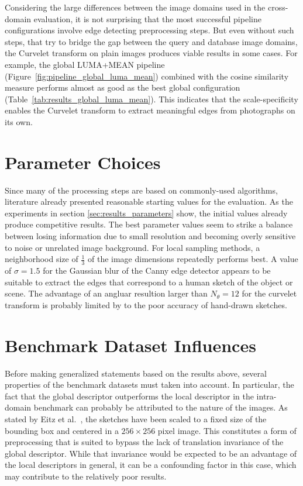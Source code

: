 Considering the large differences between the image domains used in the
cross-domain evaluation, it is not surprising that the most successful pipeline
configurations involve edge detecting preprocessing steps. But even without
such steps, that try to bridge the gap between the query and database image
domains, the Curvelet transform on plain images produces viable results in some
cases. For example, the global LUMA+MEAN pipeline
(Figure~\ref{fig:pipeline_global_luma_mean}) combined with the cosine
similarity measure performs almost as good as the best global configuration
(Table~\ref{tab:results_global_luma_mean}). This indicates that the
scale-specificity enables the Curvelet transform to extract meaningful edges
from photographs on its own.

\section{Parameter Choices}

Since many of the processing steps are based on commonly-used algorithms,
literature already presented reasonable starting values for the evaluation. As
the experiments in section \ref{sec:results_parameters} show, the initial
values already produce competitive results. The best parameter values seem to
strike a balance between losing information due to small resolution and
becoming overly sensitive to noise or unrelated image background. For local
sampling methods, a neighborhood size of $\frac{1}{3}$ of the image dimensions
repeatedly performs best. A value of $\sigma=1.5$ for the Gaussian blur of the
Canny edge detector appears to be suitable to extract the edges that correspond
to a human sketch of the object or scene. The advantage of an angluar resultion
larger than $N_{\theta}=12$ for the curvelet transform is probably limited by
to the poor accuracy of hand-drawn sketches.

\section{Benchmark Dataset Influences}

Before making generalized statements based on the results above, several
properties of the benchmark datasets must taken into account. In particular,
the fact that the global descriptor outperforms the local descriptor in the
intra-domain benchmark can probably be attributed to the nature of the images.
As stated by Eitz et al.\ \autocite{eitz_how_2012}, the sketches have been
scaled to a fixed size of the bounding box and centered in a $256 \times 256$
pixel image. This constitutes a form of preprocessing that is suited to bypass
the lack of translation invariance of the global descriptor. While that
invariance would be expected to be an advantage of the local descriptors in
general, it can be a confounding factor in this case, which may contribute to
the relatively poor results.

